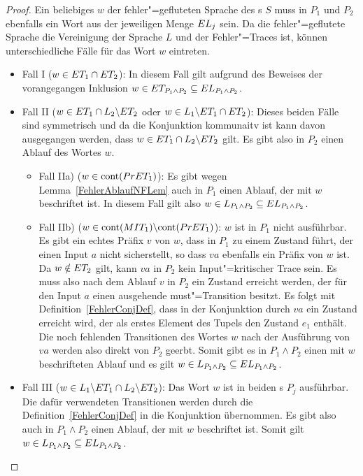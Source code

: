 \begin{proof}
  Ein beliebiges $w$ der fehler"=gefluteten Sprache des \MEIO{}s $S$ muss
  in $P_1$ und $P_2$ ebenfalls ein Wort aus der jeweiligen Menge $EL _j$ sein.
  Da die fehler"=geflutete Sprache die Vereinigung der Sprache $L$ und der
  Fehler"=Traces \ET{} ist, können unterschiedliche Fälle für das Wort $w$
  eintreten.
  \begin{itemize}
    \item Fall I ($w\in ET _1\cap ET _2$): In diesem Fall gilt aufgrund des
      Beweises der vorangegangen Inklusion $w\in ET _{P_1\land P_2}\subseteq
      EL _{P_1\land P_2}$.
    \item Fall II ($w\in ET _1\cap L_2\backslash ET _2$ oder $w\in
      L_1\backslash ET _1\cap ET _2$): Dieses beiden Fälle sind symmetrisch
      und da die Konjunktion kommunaitv ist kann \oBdA{} davon ausgegangen
      werden, dass $w\in ET _1\cap L_2\backslash ET _2$ gilt. Es gibt also in
      $P_2$ einen Ablauf des Wortes $w$.
      \begin{itemize}
        \item Fall IIa) ($w\in\mathrm{cont} (PrET _1)$): Es gibt wegen
          Lemma~\ref{FehlerAblaufNFLem} auch in $P_1$ einen Ablauf, der mit $w$
          beschriftet ist. In diesem Fall gilt also $w\in L_{P_1\land P_2}
          \subseteq EL _{P_1\land P_2}$.
        \item Fall IIb) ($w\in\mathrm{cont} (MIT _1)\backslash\mathrm{cont} (PrET _1)$): $w$
          ist in $P_1$ nicht ausführbar. Es gibt ein echtes Präfix $v$ von $w$,
          dass in $P_1$ zu einem Zustand führt, der einen Input $a$ nicht
          sicherstellt, so dass $va$ ebenfalls ein Präfix von $w$ ist. Da
          $w\notin ET _2$ gilt, kann $va$ in $P_2$ kein Input"=kritischer
          Trace sein. Es muss also nach dem Ablauf $v$ in $P_2$ ein Zustand
          erreicht werden, der für den Input $a$ einen ausgehende
          must"=Transition besitzt. Es folgt mit Definition~\ref{FehlerConjDef}, dass
          in der Konjunktion durch $va$ ein Zustand erreicht wird, der als
          erstes Element des Tupels den Zustand $e_1$ enthält. Die noch
          fehlenden Transitionen des Wortes $w$ nach der Ausführung von $va$
          werden also direkt von $P_2$ geerbt. Somit gibt es in $P_1\land P_2$
          einen mit $w$ beschrifteten Ablauf und es gilt $w\in L_{P_1\land P_2}
          \subseteq EL _{P_1\land P_2}$.
      \end{itemize}
    \item Fall III ($w\in L_1\backslash ET _1 \cap L_2\backslash ET _2$): Das
      Wort $w$ ist in beiden \MEIO{}s $P_j$ ausführbar. Die dafür verwendeten
      Transitionen werden durch die Definition~\ref{FehlerConjDef} in die Konjunktion
      übernommen. Es gibt also auch in $P_1\land P_2$ einen Ablauf, der mit $w$
      beschriftet ist. Somit gilt $w\in L_{P_1\land P_2}\subseteq EL
      _{P_1\land P_2}$.
  \end{itemize}


\end{proof}
